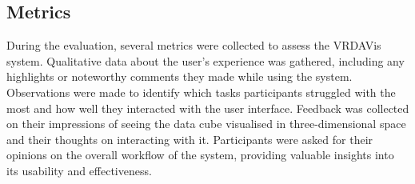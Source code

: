 \subsection{Metrics}
During the evaluation, several metrics were collected to assess the VRDAVis system. 
Qualitative data about the user's experience was gathered, including any highlights or noteworthy comments they made while using the system. 
Observations were made to identify which tasks participants struggled with the most and how well they interacted with the user interface. 
Feedback was collected on their impressions of seeing the data cube visualised in three-dimensional space and their thoughts on interacting with it. 
Participants were asked for their opinions on the overall workflow of the system, providing valuable insights into its usability and effectiveness.
